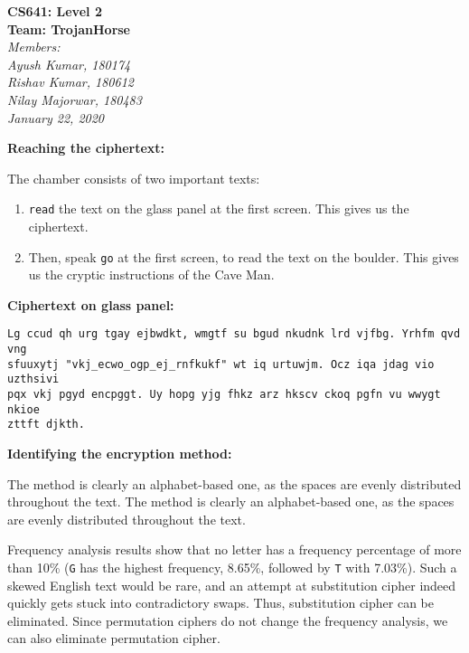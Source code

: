 \documentclass[11pt]{article}
\begin{document}
\begin{center}
  \Large\textbf{CS641: Level 2}\\
  \Large\textbf{Team: TrojanHorse}\\
  \medskip
  \large\textit{Members:\quad}\\
  \large\textit{Ayush Kumar, 180174\quad}\\
  \large\textit{Rishav Kumar, 180612\quad}\\
  \large\textit{Nilay Majorwar, 180483\quad}\\
  \medskip
  \large\textit{January 22, 2020\quad}
\end{center}

\bigskip
\bigskip

\textbf{Reaching the ciphertext: }
\medskip

The chamber consists of two important texts:
\begin{enumerate}
  \item \texttt{read} the text on the glass panel at the first screen. This gives us the ciphertext.
  \item Then, speak \texttt{go} at the first screen, to read the text on the boulder. This gives us the cryptic instructions of the Cave Man.
\end{enumerate}

\bigskip
\bigskip

\textbf{Ciphertext on glass panel: }

\begin{lstlisting}
Lg ccud qh urg tgay ejbwdkt, wmgtf su bgud nkudnk lrd vjfbg. Yrhfm qvd vng
sfuuxytj "vkj_ecwo_ogp_ej_rnfkukf" wt iq urtuwjm. Ocz iqa jdag vio uzthsivi 
pqx vkj pgyd encpggt. Uy hopg yjg fhkz arz hkscv ckoq pgfn vu wwygt nkioe
zttft djkth.
\end{lstlisting}

\bigskip
\bigskip

\textbf{Identifying the encryption method: }
\medskip

The method is clearly an alphabet-based one, as the spaces are evenly distributed throughout the text. The method is clearly an alphabet-based one, as the spaces are evenly distributed throughout the text. 
\medskip

Frequency analysis results show that no letter has a frequency percentage of more than 10\% (\texttt{G} has the highest frequency, 8.65\%, followed by \texttt{T} with 7.03\%). Such a skewed English text would be rare, and an attempt at substitution cipher indeed quickly gets stuck into contradictory swaps. Thus, substitution cipher can be eliminated. Since permutation ciphers do not change the frequency analysis, we can also eliminate permutation cipher. 
\medskip
\end{document}

